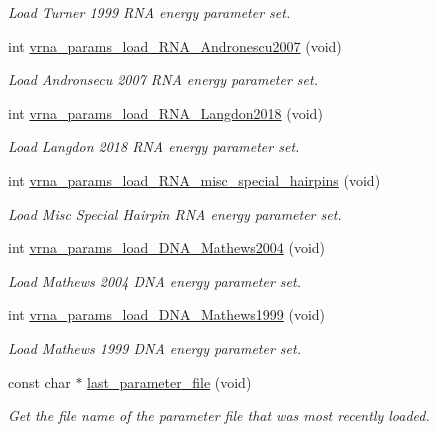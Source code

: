 \begin{DoxyCompactItemize}
\begin{DoxyCompactList}\small\item\em Load Turner 1999 R\+NA energy parameter set. \end{DoxyCompactList}\item 
int \mbox{\hyperlink{group__energy__parameters__rw_ga511a1c17c0fd10a1fbb0936674712ff8}{vrna\+\_\+params\+\_\+load\+\_\+\+R\+N\+A\+\_\+\+Andronescu2007}} (void)
\begin{DoxyCompactList}\small\item\em Load Andronsecu 2007 R\+NA energy parameter set. \end{DoxyCompactList}\item 
int \mbox{\hyperlink{group__energy__parameters__rw_ga3a87fe5e73eb906c0fa26f2c42c787fd}{vrna\+\_\+params\+\_\+load\+\_\+\+R\+N\+A\+\_\+\+Langdon2018}} (void)
\begin{DoxyCompactList}\small\item\em Load Langdon 2018 R\+NA energy parameter set. \end{DoxyCompactList}\item 
int \mbox{\hyperlink{group__energy__parameters__rw_ga00e07504d66dc24aca7befb4bdaa0db1}{vrna\+\_\+params\+\_\+load\+\_\+\+R\+N\+A\+\_\+misc\+\_\+special\+\_\+hairpins}} (void)
\begin{DoxyCompactList}\small\item\em Load Misc Special Hairpin R\+NA energy parameter set. \end{DoxyCompactList}\item 
int \mbox{\hyperlink{group__energy__parameters__rw_gafa45b5734355baa634ca0a2e2857563e}{vrna\+\_\+params\+\_\+load\+\_\+\+D\+N\+A\+\_\+\+Mathews2004}} (void)
\begin{DoxyCompactList}\small\item\em Load Mathews 2004 D\+NA energy parameter set. \end{DoxyCompactList}\item 
int \mbox{\hyperlink{group__energy__parameters__rw_ga4d897130a700f86b7d4035a95f25615a}{vrna\+\_\+params\+\_\+load\+\_\+\+D\+N\+A\+\_\+\+Mathews1999}} (void)
\begin{DoxyCompactList}\small\item\em Load Mathews 1999 D\+NA energy parameter set. \end{DoxyCompactList}\item 
const char $\ast$ \mbox{\hyperlink{group__energy__parameters__rw_ga5abafd7bad6d506e18bed13b18123cfe}{last\+\_\+parameter\+\_\+file}} (void)
\begin{DoxyCompactList}\small\item\em Get the file name of the parameter file that was most recently loaded. \end{DoxyCompactList}\item 

\end{DoxyCompactItemize}
